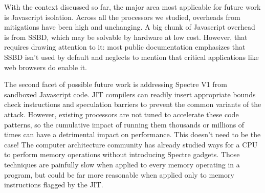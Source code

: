 With the context discussed so far, the major area most applicable for future work is Javascript isolation.
Across all the processors we studied, overheads from mitigations have been high and unchanging.
A big chunk of Javascript overhead is from SSBD, which may be solvable by hardware at low cost.
However, that requires drawing attention to it: most public documentation emphasizes that SSBD isn't used by default and neglects to mention that critical applications like web browsers do enable it.

The second facet of possible future work is addressing Spectre V1 from sandboxed Javascript code.
JIT compilers can readily insert appropriate bounds check instructions and speculation barriers to prevent the common variants of the attack.
However, existing processors are not tuned to accelerate these code patterns, so the cumulative impact of running them thousands or millions of times can have a detrimental impact on performance.
This doesn't need to be the case!
The computer architecture community has already studied ways for a CPU to perform memory operations without introducing Spectre gadgets.
Those techniques are painfully slow when applied to every memory operating in a program, but could be far more reasonable when applied only to memory instructions flagged by the JIT.
